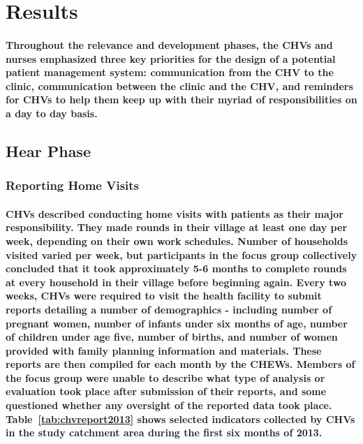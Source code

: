 \section{Results}
\paragraph{Throughout the relevance and development phases, the CHVs and nurses emphasized three key priorities for the design of a potential patient management system: communication from the CHV to the clinic, communication between the clinic and the CHV, and reminders for CHVs to help them keep up with their myriad of responsibilities on a day to day basis.} 


\subsection{Hear Phase}

\subsubsection{Reporting Home Visits}
\paragraph{CHVs described conducting home visits with patients as their major responsibility. They made rounds in their village at least one day per week, depending on their own work schedules. Number of households visited varied per week, but participants in the focus group collectively concluded that it took approximately 5-6 months to complete rounds at every household in their village before beginning again. Every two weeks, CHVs were required to visit the health facility to submit reports detailing a number of demographics - including number of pregnant women, number of infants under six months of age, number of children under age five, number of births, and number of women provided with family planning information and materials. These reports are then compiled for each month by the CHEWs. Members of the focus group were unable to describe what type of analysis or evaluation took place after submission of their reports, and some questioned whether any oversight of the reported data took place. Table~\ref{tab:chvreport2013} shows selected indicators collected by CHVs in the study catchment area during the first six months of 2013. }

